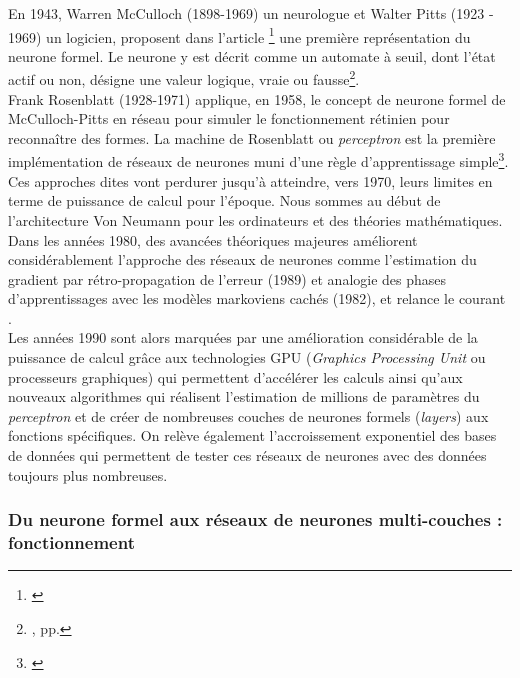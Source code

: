 En 1943, Warren McCulloch (1898-1969) un neurologue et Walter Pitts (1923 - 1969) un logicien, proposent dans l'article \footnote{\cite{mcculloch_logical_1943}} une première représentation du neurone formel. Le neurone y est décrit comme un automate à seuil, dont l'état actif ou non, désigne une valeur logique, vraie ou fausse\footnote{\cite{varela_invitation_1996}, pp.}.\\

Frank Rosenblatt (1928-1971) applique, en 1958, le concept de neurone formel de McCulloch-Pitts en réseau pour simuler le fonctionnement rétinien pour reconnaître des formes. La machine de Rosenblatt ou \textit{perceptron} est la première implémentation de réseaux de neurones muni d'une règle d'apprentissage simple\footnote{\cite{rosenblatt_perceptron_1958}}.\\

Ces approches dites  vont perdurer jusqu'à atteindre, vers 1970, leurs limites en terme de puissance de calcul pour l'époque. Nous sommes au début de l'architecture Von Neumann pour les ordinateurs et des théories mathématiques.\\

Dans les années 1980, des avancées théoriques majeures améliorent considérablement l'approche des réseaux de neurones comme l'estimation du gradient par rétro-propagation de l'erreur (1989) et analogie des phases d'apprentissages avec les modèles markoviens cachés (1982), et relance le courant .\\

Les années 1990 sont alors marquées par une amélioration considérable de la puissance de calcul grâce aux technologies GPU (\textit{Graphics Processing Unit} ou processeurs graphiques) qui permettent d'accélérer les calculs ainsi qu'aux nouveaux algorithmes qui réalisent l'estimation de millions de paramètres du \textit{perceptron} et de créer de nombreuses couches de neurones formels (\textit{layers}) aux fonctions spécifiques. On relève également l'accroissement exponentiel des bases de données qui permettent de tester ces réseaux de neurones avec des données toujours plus nombreuses.

\subsubsection{Du neurone formel aux réseaux de neurones multi-couches : fonctionnement}  

